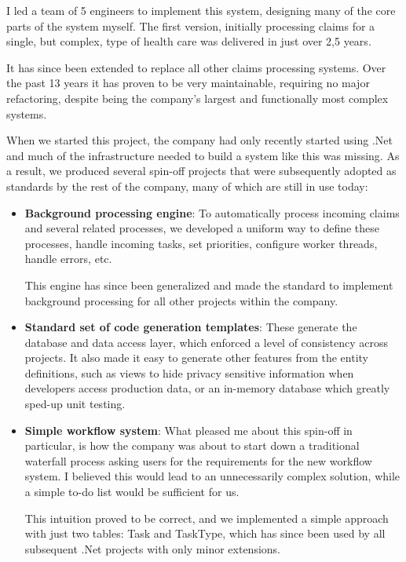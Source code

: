 \documentclass[10pt,a4paper]{../altacv}
\begin{document}
\begin{fullwidth}
\medskip\medskip

I led a team of 5 engineers to implement this system, designing many of the core parts of the system myself. The first version, initially processing claims for a single, but complex, type of health care was delivered in just over 2,5 years.

\medskip\medskip

It has since been extended to replace all other claims processing systems. Over the past 13 years it has proven to be very maintainable, requiring no major refactoring, despite being the company’s largest and functionally most complex systems.

\medskip\medskip

When we started this project, the company had only recently started using .Net and much of the infrastructure needed to build a system like this was missing. As a result, we produced several spin-off projects that were subsequently adopted as standards by the rest of the company, many of which are still in use today:

\medskip\medskip

\begin{itemize}
	\item\small \textbf{Background processing engine}: To automatically process incoming claims and several related processes, we developed a uniform way to define these processes, handle incoming tasks, set priorities, configure worker threads, handle errors, etc.
	
	This engine has since been generalized and made the standard to implement background processing for all other projects within the company.
	\item\small \textbf{Standard set of code generation templates}: These generate the database and data access layer, which enforced a level of consistency across projects. It also made it easy to generate other features from the entity definitions, such as views to hide privacy sensitive information when developers access production data, or an in-memory database which greatly sped-up unit testing.
	\item\small \textbf{Simple workflow system}: What pleased me about this spin-off in particular, is how the company was about to start down a traditional waterfall process asking users for the requirements for the new workflow system. I believed this would lead to an unnecessarily complex solution, while a simple to-do list would be sufficient for us.
	
	This intuition proved to be correct, and we implemented a simple approach with just two tables: Task and TaskType, which has since been used by all subsequent .Net projects with only minor extensions.
\end{itemize}


\end{fullwidth}
\end{document}

